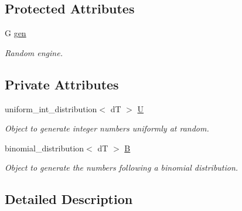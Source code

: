 \subsection*{Protected Attributes}
\begin{DoxyCompactItemize}
\item 
G \hyperlink{classlgraph_1_1utils_1_1random__generator_a18353876b4c2d3a18aee454b5750a0a0}{gen}\hypertarget{classlgraph_1_1utils_1_1random__generator_a18353876b4c2d3a18aee454b5750a0a0}{}\label{classlgraph_1_1utils_1_1random__generator_a18353876b4c2d3a18aee454b5750a0a0}

\begin{DoxyCompactList}\small\item\em Random engine. \end{DoxyCompactList}\end{DoxyCompactItemize}
\subsection*{Private Attributes}
\begin{DoxyCompactItemize}
\item 
uniform\+\_\+int\+\_\+distribution$<$ dT $>$ \hyperlink{classlgraph_1_1utils_1_1drandom__generator_a6949a3bf302e877b8898baa2a0da6bba}{U}\hypertarget{classlgraph_1_1utils_1_1drandom__generator_a6949a3bf302e877b8898baa2a0da6bba}{}\label{classlgraph_1_1utils_1_1drandom__generator_a6949a3bf302e877b8898baa2a0da6bba}

\begin{DoxyCompactList}\small\item\em Object to generate integer numbers uniformly at random. \end{DoxyCompactList}\item 
binomial\+\_\+distribution$<$ dT $>$ \hyperlink{classlgraph_1_1utils_1_1drandom__generator_a9cacdee7725cd90b02d5d1b9bdc1e5d1}{B}\hypertarget{classlgraph_1_1utils_1_1drandom__generator_a9cacdee7725cd90b02d5d1b9bdc1e5d1}{}\label{classlgraph_1_1utils_1_1drandom__generator_a9cacdee7725cd90b02d5d1b9bdc1e5d1}

\begin{DoxyCompactList}\small\item\em Object to generate the numbers following a binomial distribution. \end{DoxyCompactList}\end{DoxyCompactItemize}


\subsection{Detailed Description}
